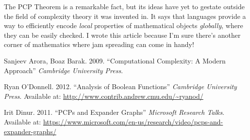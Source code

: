 \documentclass{article}
\theoremstyle{plain}
\theoremstyle{remark}
\theoremstyle{definition}
\begin{document}
\begin{multicols}{2}
The PCP Theorem is a remarkable fact, but its ideas have yet to gestate outside the field of complexity theory it was invented in. It says that languages provide a way to efficiently encode {\it local} properties of mathematical objects {\it globally}, where they can be easily checked. I wrote this article because I'm sure there's another corner of mathematics where jam spreading can come in handy!

\begin{thebibliography}{9}

Sanjeev Arora, Boaz Barak. 2009.
``Computational Complexity: A Modern Approach'' {\it Cambridge University Press}.

Ryan O'Donnell. 2012.
``Analysis of Boolean Functions'' {\it Cambridge University Press}. Available at: \url{http://www.contrib.andrew.cmu.edu/~ryanod/}

Irit Dinur. 2011.
``PCPs and Expander Graphs'' {\it Microsoft Research Talks}. Available at: \url{https://www.microsoft.com/en-us/research/video/pcps-and-expander-graphs/}

\end{thebibliography}

\end{multicols}

\end{document}

